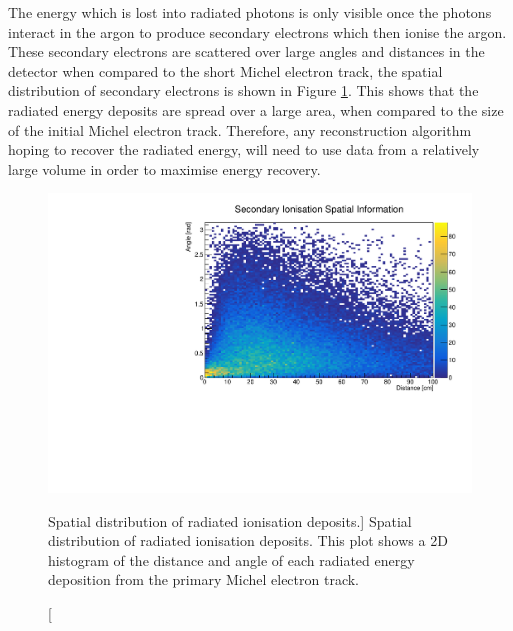 The energy which is lost into radiated photons is only visible once the photons
interact in the argon to produce secondary electrons which then ionise the
argon. These secondary electrons are scattered over large angles and distances
in the detector when compared to the short Michel electron track, the spatial 
distribution of secondary electrons is shown in Figure \ref{fig:photon_geom}.
This shows that the radiated energy deposits are spread over a large area, when
compared to the size of the initial Michel electron track. Therefore, any 
reconstruction algorithm hoping to recover the radiated energy, will 
need to use data from a relatively large volume in order to maximise energy
recovery.
\begin{figure}
	\centering
	\includegraphics[width=\textwidth]{figures/photon_geom.pdf}
	\caption
	[Spatial distribution of radiated ionisation deposits.]
	{Spatial distribution of radiated ionisation deposits. This plot shows a
	2D histogram of the distance and angle of each radiated energy deposition 
	from the primary Michel electron track.}
	\label{fig:photon_geom}
\end{figure}

